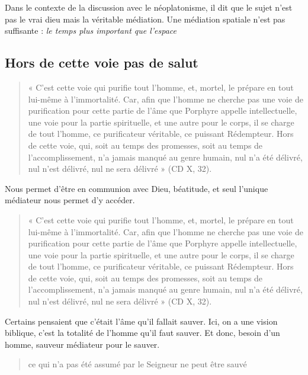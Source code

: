 Dans le contexte de la discussion avec le néoplatonisme, il dit que le sujet n'est pas le vrai dieu mais la véritable médiation. Une médiation spatiale n'est pas suffisante : \textit{le temps plus important que l'espace}


\subsection{Hors de cette voie pas de salut }
 
 

\begin{quote}
« C’est cette voie qui purifie tout l’homme, et, mortel, le prépare en tout lui-même à l’immortalité.
Car, afin que l’homme ne cherche pas une voie de purification pour cette partie de l’âme que Porphyre
appelle intellectuelle, une voie pour la partie spirituelle, et une autre pour le corps, il se charge de tout
l’homme, ce purificateur véritable, ce puissant Rédempteur. Hors de cette voie, qui, soit au temps des
promesses, soit au temps de l’accomplissement, n’a jamais manqué au genre humain, nul n’a été
délivré, nul n’est délivré, nul ne sera délivré » (CD X, 32).
\end{quote}

Nous permet d'être en communion avec Dieu, béatitude, et seul l'unique médiateur nous permet d'y accéder.

 

\begin{quote}
    «  C’est  cette  voie  qui  purifie  tout  l’homme,  et,  mortel,  le  prépare  en  tout  lui-même  à  l’immortalité. Car,  afin  que  l’homme  ne  cherche  pas  une  voie  de  purification  pour  cette  partie  de  l’âme  que  Porphyre appelle  intellectuelle,  une  voie  pour  la  partie  spirituelle,  et  une  autre  pour  le  corps,  il  se  charge  de  tout l’homme,  ce  purificateur  véritable,  ce  puissant  Rédempteur.  Hors  de  cette  voie,  qui,  soit  au  temps  des promesses,  soit  au  temps  de  l’accomplissement,  n’a  jamais  manqué  au  genre  humain,  nul  n’a  été délivré,  nul  n’est  délivré,  nul  ne  sera  délivré  »  (CD  X,  32). 
\end{quote}
 
 Certains pensaient que c'était l'âme qu'il fallait sauver. Ici, on a une vision biblique, c'est la totalité de l'homme qu'il faut sauver. Et donc, besoin d'un homme, sauveur médiateur pour le sauver.
 \begin{quote}
     ce qui n'a pas été assumé par le Seigneur ne peut être sauvé 
 \end{quote}

